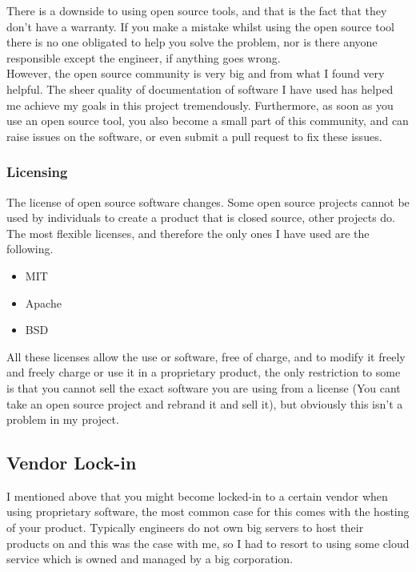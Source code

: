 \documentclass[titlepage]{article}
\begin{document}
There is a downside to using open source tools, and that is the fact that they don't have a warranty. If you make a mistake whilst using the open source tool there is no one obligated to help you solve the problem, nor is there anyone responsible except the engineer, if anything goes wrong.  \\

However, the open source community is very big and from what I found very helpful. The sheer quality of documentation of software I have used has helped me achieve my goals in this project tremendously. Furthermore, as soon as you use an open source tool, you also become a small part of this community, and can raise issues on the software, or even submit a pull request to fix these issues. 

\subsubsection{Licensing}
The license of open source software changes. Some open source projects cannot be used by individuals to create a product that is closed source, other projects do. The most flexible licenses, and therefore the only ones I have used are the following.

\begin{itemize}
  \item MIT~\cite{mit}
  \item Apache~\cite{apache}
  \item BSD~\cite{bsd}
\end{itemize}

All these licenses allow the use or software, free of charge, and to modify it freely and freely charge or use it in a proprietary product, the only restriction to some is that you cannot sell the exact software you are using from a license (You cant take an open source project and rebrand it and sell it), but obviously this isn't a problem in my project.

\subsection{Vendor Lock-in}
I mentioned above that you might become locked-in to a certain vendor when using proprietary software, the most common case for this comes with the hosting of your product. Typically engineers do not own big servers to host their products on and this was the case with me, so I had to resort to using some cloud service which is owned and managed by a big corporation. \\
\end{document}
